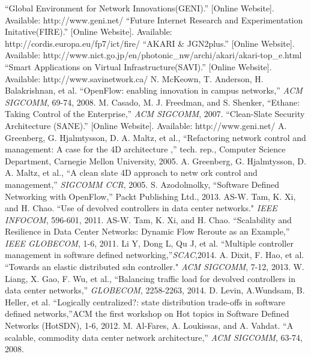 \documentclass[cs4size, a4paer, oneside, openany, nocap]{sjtuthesis}
\begin{document}
\begin{thebibliography}{1}
 ``Global Environment for Network Innovations(GENI).'' [Online Website]. Available: http://www.geni.net/
 ``Future Internet Research and Experimentation Initative(FIRE).'' [Online Website]. Available: http://cordis.europa.eu/fp7/ict/fire/
 ``AKARI \& JGN2plus.'' [Online Website]. Available: http://www.nict.go.jp/en/photonic\_nw/archi/akari/akari-top\_e.html
 ``Smart Applications on Virtual Infrastructure(SAVI).'' [Online Website]. Available: http://www.savinetwork.ca/
N. McKeown, T. Anderson, H. Balakrishnan, et al. ``OpenFlow: enabling innovation in campus networks,'' \emph{ACM SIGCOMM}, 69-74, 2008.
 M. Casado, M. J. Freedman, and S. Shenker, ``Ethane: Taking Control of the Enterprise,'' \emph{ACM SIGCOMM}, 2007.
 ``Clean-Slate Security Architecture (SANE).'' [Online Website]. Available: http://www.geni.net/
 A. Greenberg, G. Hjalmtysson, D. A. Maltz, et al., ``Refactoring network control and management: A case for the 4D architecture ,'' tech. rep., Computer Science Department, Carnegie Mellon University, 2005.
 A. Greenberg, G. Hjalmtysson, D. A. Maltz, et al., ``A clean slate 4D approach to netw ork control and management,'' \emph{SIGCOMM CCR}, 2005.
S. Azodolmolky, ``Software Defined Networking with OpenFlow,'' Packt Publishing Ltd., 2013.
AS-W. Tam, K. Xi, and H. Chao. ``Use of devolved controllers in data center networks." \emph{IEEE INFOCOM}, 596-601, 2011.
AS-W. Tam, K. Xi, and H. Chao. ``Scalability and Resilience in Data Center Networks: Dynamic Flow Reroute as an Example,'' \emph{IEEE GLOBECOM}, 1-6, 2011.
Li Y, Dong L, Qu J, et al. ``Multiple controller management in software defined networking,''\emph{SCAC},2014.
A. Dixit, F. Hao, et al. ``Towards an elastic distributed sdn controller." \emph{ACM SIGCOMM}, 7-12, 2013.
W. Liang, X. Gao, F. Wu, et al., ``Balancing traffic load for devolved controllers in data center networks,'' \emph{GLOBECOM}, 2258-2263, 2014.
D. Levin, A.Wundsam, B. Heller, et al. ``Logically centralized?: state distribution trade-offs in software defined networks,''ACM the first workshop on Hot topics in Software Defined Networks (HotSDN), 1-6, 2012.
M. Al-Fares, A. Loukissas, and A. Vahdat. ``A scalable, commodity data center network architecture,'' \emph{ACM SIGCOMM}, 63-74, 2008.

\end{thebibliography}
\end{document}
